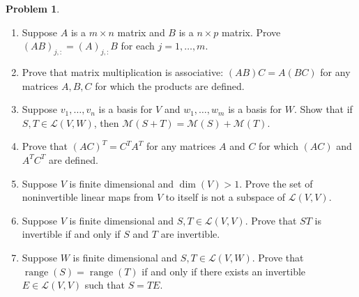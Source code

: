 \documentclass[12pt]{article}
\theoremstyle{definition}
\newtheorem{problem}{Problem}
\newcommand{\range}{\operatorname{range}}
\begin{document}
\begin{problem}~
\begin{enumerate}
    \item Suppose $A$ is a $m\times n$ matrix and $B$ is a $n\times p$ matrix. Prove $(AB)_{j,:} = (A)_{j,:}B$ for each $j=1, \ldots, m$.
    \item Prove that matrix multiplication is associative: $(AB)C = A(BC)$ for any matrices $A,B,C$ for which the products are defined.
    \item Suppose $v_1,\ldots,v_n$ is a basis for $V$ and $w_1, \ldots, w_m$ is a basis for $W$. Show that if $S,T\in\mathcal{L}(V,W)$, then $\mathcal{M}(S+T) = \mathcal{M}(S) + \mathcal{M}(T)$.
    \item Prove that $(AC)^T = C^TA^T$ for any matrices $A$ and $C$ for which $(AC)$ and $A^TC^T$ are defined.
    \item Suppose $V$ is finite dimensional and $\dim(V) >1$. Prove the set of noninvertible linear maps from $V$ to itself is not a subspace of $\mathcal{L}(V,V)$.
    \item Suppose $V$ is finite dimensional and $S,T\in\mathcal{L}(V,V)$. Prove that $ST$ is invertible if and only if $S$ and $T$ are invertible.
    \item Suppose $W$ is finite dimensional and $S,T \in \mathcal{L}(V,W)$. Prove that $\range(S) = \range(T)$ if and only if there exists an invertible $E\in\mathcal{L}(V,V)$ such that $S = T E$.
\end{enumerate}
\end{problem}
\end{document}
